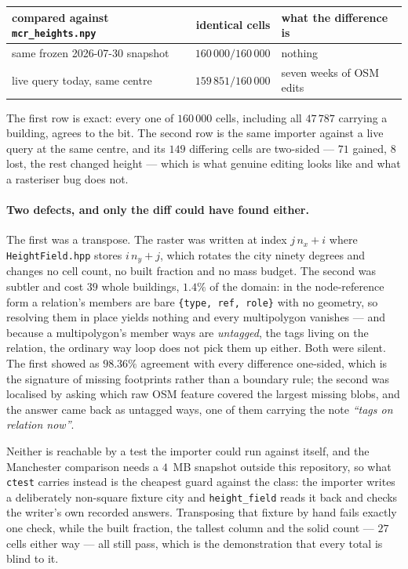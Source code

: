 \documentclass[11pt,a4paper]{article}
\newcommand{\code}[1]{\texttt{\small #1}}
\begin{document}
\begin{center}
\begin{tabular}{lrl}
\toprule
compared against \code{mcr\_heights.npy} & identical cells & what the difference is \\
\midrule
same frozen 2026-07-30 snapshot & $160\,000/160\,000$ & nothing \\
live query today, same centre   & $159\,851/160\,000$ & seven weeks of OSM edits \\
\bottomrule
\end{tabular}
\end{center}

\noindent The first row is exact: every one of $160\,000$ cells, including all
$47\,787$ carrying a building, agrees to the bit. The second row is the same
importer against a live query at the same centre, and its $149$ differing cells
are two-sided --- $71$ gained, $8$ lost, the rest changed height --- which is
what genuine editing looks like and what a rasteriser bug does not.

\paragraph{Two defects, and only the diff could have found either.} The first
was a transpose. The raster was written at index $j\,n_x+i$ where
\code{HeightField.hpp} stores $i\,n_y+j$, which rotates the city ninety
degrees and changes no cell count, no built fraction and no mass budget. The
second was subtler and cost $39$ whole buildings, $1.4\%$ of the domain: in the
node-reference form a relation's members are bare \code{\{type, ref, role\}}
with no geometry, so resolving them in place yields nothing and every
multipolygon vanishes --- and because a multipolygon's member ways are
\emph{untagged}, the tags living on the relation, the ordinary way loop does
not pick them up either. Both were silent. The first showed as $98.36\%$
agreement with every difference one-sided, which is the signature of missing
footprints rather than a boundary rule; the second was localised by asking
which raw OSM feature covered the largest missing blobs, and the answer came
back as untagged ways, one of them carrying the note
\emph{``tags on relation now''}.

Neither is reachable by a test the importer could run against itself, and the
Manchester comparison needs a $4$~MB snapshot outside this repository, so what
\code{ctest} carries instead is the cheapest guard against the class: the
importer writes a deliberately non-square fixture city and \code{height\_field}
reads it back and checks the writer's own recorded answers. Transposing that
fixture by hand fails exactly one check, while the built fraction, the tallest
column and the solid count --- $27$ cells either way --- all still pass, which
is the demonstration that every total is blind to it.
\end{document}
